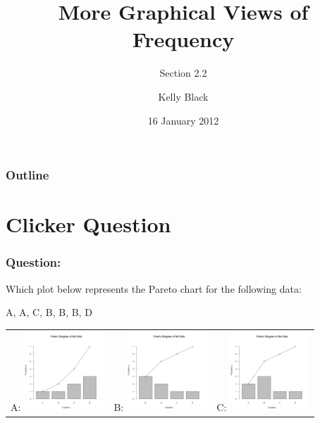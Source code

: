

\title{More Graphical Views of Frequency}
\subtitle{Section 2.2}

\author{Kelly Black}
\date{16 January 2012}

\begin{frame}
  \titlepage
\end{frame}

\begin{frame}
  \frametitle{Outline}
\end{frame}


\section{Clicker Question}


\begin{frame}
  \frametitle{Question:}

  Which plot below represents the Pareto chart for the following data:

    A, A, C, B, B, B, D

    \begin{tabular}{ccc}
      A: \includegraphics[width=3cm]{img/paretoQuizW1D2-a} &
      B: \includegraphics[width=3cm]{img/paretoQuizW1D2-b} &
      C: \includegraphics[width=3cm]{img/paretoQuizW1D2-c}
  \end{tabular}

\end{frame}



